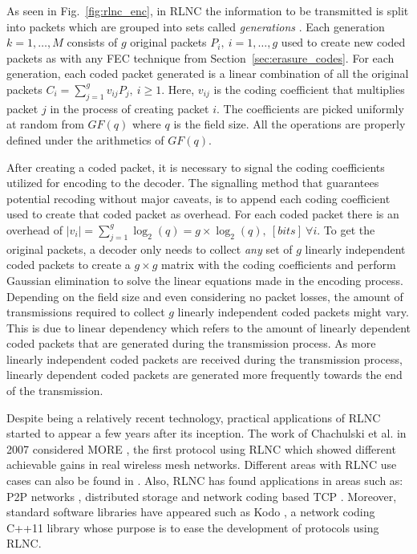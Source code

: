 As seen in Fig.~\ref{fig:rlnc_enc}, in \ac{RLNC} the information to be transmitted is split into packets which are grouped into sets called \textit{generations} \cite{chou2003practical}. Each generation $k = 1, \ldots, M$ consists of $g$ original packets $P_i,\ i = 1, \ldots, g$ used to create new coded packets as with any \ac{FEC} technique from Section~\ref{sec:erasure_codes}. For each generation, each coded packet generated is a linear combination of all the original packets $C_i = \sum_{j = 1}^g v_{ij} P_j,\ i \geq 1$. Here, $v_{ij}$ is the coding coefficient that multiplies packet $j$ in the process of creating packet $i$. The coefficients are picked uniformly at random from $GF(q)$ where $q$ is the field size. All the operations are properly defined under the arithmetics of $GF(q)$.

After creating a coded packet, it is necessary to signal the coding coefficients utilized for encoding to the decoder. The signalling method that guarantees potential recoding without major caveats, is to append each coding coefficient used to create that coded packet as overhead. For each coded packet there is an overhead of $|v_{i}| = \sum_{j = 1}^g \log_{2}(q) = g \times \log_{2}(q),\ [bits]\ \forall i$. To get the original packets, a decoder only needs to collect \textit{any} set of $g$ linearly independent coded packets to create a $g \times g$ matrix with the coding coefficients and perform Gaussian elimination \cite{fragouli2006network} to solve the linear equations made in the encoding process. Depending on the field size and even considering no packet losses, the amount of transmissions required to collect $g$ linearly independent coded packets might vary. This is due to linear dependency which refers to the amount of linearly dependent coded packets that are generated during the transmission process. As more linearly independent coded packets are received during the transmission process, linearly dependent coded packets are generated more frequently towards the end of the transmission.

Despite being a relatively recent technology, practical applications of \ac{RLNC} started to appear a few years after its inception. The work of Chachulski et al. in 2007 considered \ac{MORE} \cite{chachulski2007more}, the first protocol using \ac{RLNC} which showed different achievable gains in real wireless mesh networks. Different areas with \ac{RLNC} use cases can also be found in \cite{fragouli2006network}. Also, \ac{RLNC} has found applications in areas such as: \ac{P2P} networks \cite{gkantsidis2005network}, distributed storage \cite{dimakis2010network} and network coding based \ac{TCP} \cite{kim2014modeling}. Moreover, standard software libraries have appeared such as Kodo \cite{kodo2011pedersen}, a network coding C++11 library whose purpose is to ease the development of protocols using \ac{RLNC}.

